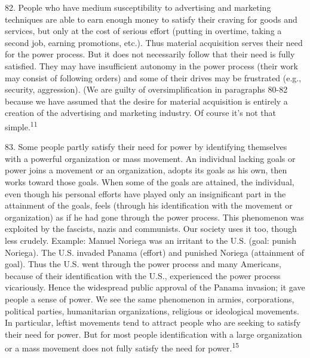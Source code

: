 \documentclass{article}
\begin{document}
82.  People who have medium susceptibility to advertising and marketing techniques are able to 
earn enough money to satisfy their craving for goods and services, but only at the cost of serious 
effort  (putting  in  overtime,  taking  a  second  job,  earning  promotions,  etc.).   Thus  material  
acquisition serves their need for the power process.  But it does not necessarily follow that their 
need is fully satisfied.  They may have insufficient autonomy in the power process (their work may 
consist of following orders) and some of their drives may be frustrated (e.g., security, 
aggression).  (We are guilty of oversimplification in paragraphs 80-82 because we have assumed 
that  the  desire  for  material  acquisition  is  entirely  a  creation  of  the  advertising  and  marketing  
industry.  Of course it’s not that simple.\textsuperscript{11} \vspace{\baselineskip}

83.  Some  people  partly  satisfy  their  need  for  power  by  identifying  themselves  with  a  powerful  
organization or mass movement.  An individual lacking goals or power joins a movement or an 
organization, adopts its goals as his own, then works toward those goals.  When some of the goals 
are attained, the individual, even though his personal efforts have played only an insignificant part 
in the attainment of the goals, feels (through his identification with the movement or organization) 
as if he had gone through the power process.  This phenomenon was exploited by the fascists, nazis 
and communists.  Our society uses it too, though less crudely.  Example: Manuel Noriega was an 
irritant to the U.S. (goal: punish Noriega). The U.S. invaded Panama (effort) and punished Noriega 
(attainment of goal). Thus the U.S. went through the power process and many Americans, because 
of  their  identification  with  the  U.S.,  experienced  the  power  process  vicariously. Hence  the 
widespread public approval of the Panama invasion; it gave people a sense of power. We see the 
same phenomenon in armies, corporations, political parties, humanitarian organizations, religious 
or ideological movements. In particular, leftist movements tend to attract people who are seeking 
to satisfy their need for power. But for most people identification with a large organization or a 
mass movement does not fully satisfy the need for power.\textsuperscript{15} \vspace{\baselineskip} 
\end{document}
